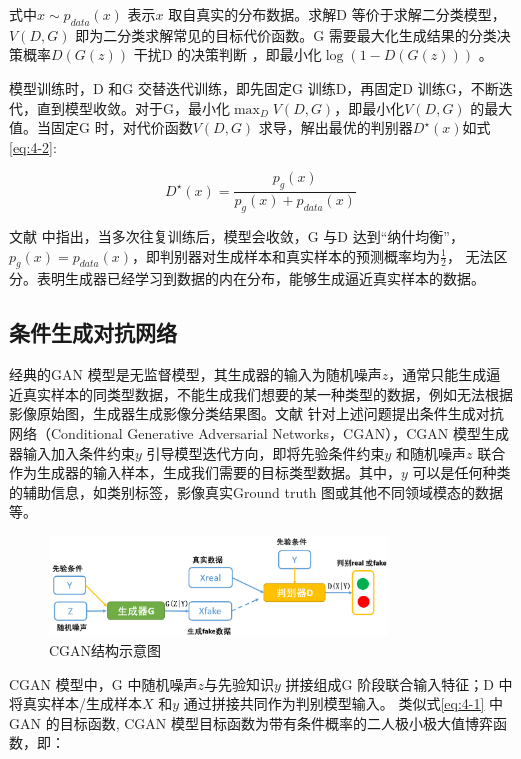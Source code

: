 式中$x \sim p_{data}(x)$ 表示$x$ 取自真实的分布数据。求解D 等价于求解二分类模型，$ V(D,G)$ 即为二分类求解常见的目标代价函数。G 需要最大化生成结果的分类决策概率$D(G(z))$ 干扰D 的决策判断 ，即最小化$\log (1-D(G(z)))$ 。

模型训练时，D 和G 交替迭代训练，即先固定G 训练D，再固定D 训练G，不断迭代，直到模型收敛。对于G，最小化$\mathop{\max}_{D} V(D,G) $，即最小化$V(D,G)$ 的最大值。当固定G 时，对代价函数$V(D,G)$ 求导，解出最优的判别器$D^{\star}(x)$如式\ref{eq:4-2}:

\begin{equation}
  \label{eq:4-2}
  D^{\star}(x) = \frac{p_g(x)}{p_g(x)+p_{data}(x)}
\end{equation}

文献\cite{goodfellow2014generative} 中指出，当多次往复训练后，模型会收敛，G 与D 达到“纳什均衡”，$p_g(x) = p_{data}(x)$，即判别器对生成样本和真实样本的预测概率均为$\frac{1}{2}$， 无法区分。表明生成器已经学习到数据的内在分布，能够生成逼近真实样本的数据。


\subsection{条件生成对抗网络}
\label{sec:first-2}
经典的GAN 模型是无监督模型，其生成器的输入为随机噪声$z$，通常只能生成逼近真实样本的同类型数据，不能生成我们想要的某一种类型的数据，例如无法根据影像原始图，生成器生成影像分类结果图。文献\cite{mirza2014conditional} 针对上述问题提出条件生成对抗网络（Conditional Generative Adversarial Networks，CGAN），CGAN 模型生成器输入加入条件约束$y$ 引导模型迭代方向，即将先验条件约束$y$ 和随机噪声$z$ 联合作为生成器的输入样本，生成我们需要的目标类型数据。其中，$y$ 可以是任何种类的辅助信息，如类别标签，影像真实Ground truth 图或其他不同领域模态的数据等。

\begin{figure}[htb]
  \centering
  \includegraphics[width=0.8\textwidth]{figures/cgan}
  \caption{CGAN结构示意图}\label{fig:cgan}
\end{figure}

CGAN 模型中，G 中随机噪声$z$与先验知识$y$ 拼接组成G 阶段联合输入特征；D 中将真实样本/生成样本$X$ 和$y$ 通过拼接共同作为判别模型输入。 类似式\ref{eq:4-1} 中GAN 的目标函数, CGAN 模型目标函数为带有条件概率的二人极小极大值博弈函数，即：

